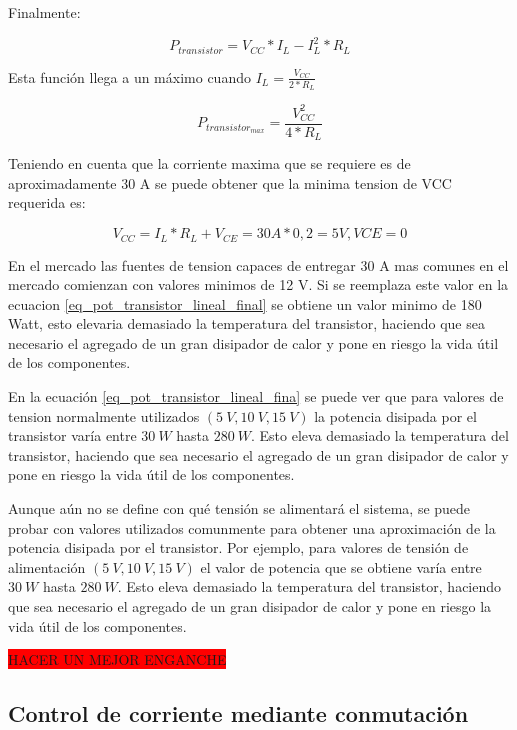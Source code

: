 Finalmente:

\begin{equation}
	P_{transistor}=V_{CC}*I_L-I_L^2*R_L
\end{equation}

Esta función llega a un máximo cuando $I_L=\frac{V_{CC}}{2*R_L}$


\begin{equation}\label{eq_pot_transistor_lineal_final}
	P_{transistor_{max}}=\frac{V_{CC}^2}{4*R_L}
\end{equation}

Teniendo en cuenta que la corriente maxima que se requiere es de aproximadamente 30 A se puede obtener que la minima tension de VCC requerida es:

\begin{equation}
	V_{CC}=I_L*R_L+V_{CE}=30 A * 0,2  = 5 V, VCE=0
\end{equation}

En el mercado las fuentes de tension capaces de entregar 30 A mas comunes en el mercado comienzan con valores minimos de 12 V. Si se reemplaza este valor en la ecuacion  \ref{eq_pot_transistor_lineal_final} se obtiene un valor minimo de 180 Watt, esto elevaria demasiado la temperatura del transistor, haciendo que sea necesario el agregado de un gran disipador de calor y pone en riesgo la vida útil de los componentes.
  
En la ecuación \ref{eq_pot_transistor_lineal_fina} se puede ver que para valores de tension normalmente utilizados $(5\:V,10\:V,15\:V)$ la potencia disipada por el transistor varía entre $30\:W$ hasta $280\:W$. Esto eleva demasiado la temperatura del transistor, haciendo que sea necesario el agregado de un gran disipador de calor y pone en riesgo la vida útil de los componentes.

Aunque aún no se define con qué tensión se alimentará el sistema, se puede probar con valores utilizados comunmente para obtener una aproximación de la potencia disipada por el transistor. Por ejemplo, para valores de tensión de alimentación $(5\:V,10\:V,15\:V)$ el valor de potencia que se obtiene varía entre $30\:W$ hasta $280\:W$. Esto eleva demasiado la temperatura del transistor, haciendo que sea necesario el agregado de un gran disipador de calor y pone en riesgo la vida útil de los componentes.

\colorbox{red}{HACER UN MEJOR ENGANCHE}

\subsection{Control de corriente mediante conmutación}

